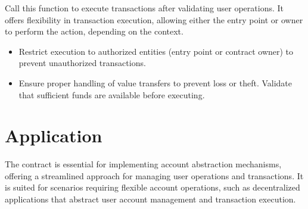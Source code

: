 \documentclass[a4paper,10pt,english]{sphinxmanual}
\begin{document}
\sphinxAtStartPar
{}

\sphinxAtStartPar
Call this function to execute transactions after validating user operations. It offers flexibility in transaction execution, allowing either the entry point or owner to perform the action, depending on the context.

\sphinxAtStartPar
{}
\begin{itemize}
\item {} 
\sphinxAtStartPar
{} Restrict execution to authorized entities (entry point or contract owner) to prevent unauthorized transactions.

\item {} 
\sphinxAtStartPar
{} Ensure proper handling of value transfers to prevent loss or theft. Validate that sufficient funds are available before executing.

\end{itemize}


\section{Application}
\label{\detokenize{docs_minimal_account_abstraction:application}}
\sphinxAtStartPar
The  contract is essential for implementing account abstraction mechanisms, offering a streamlined approach for managing user operations and transactions. It is suited for scenarios requiring flexible account operations, such as decentralized applications that abstract user account management and transaction execution.
\end{document}
